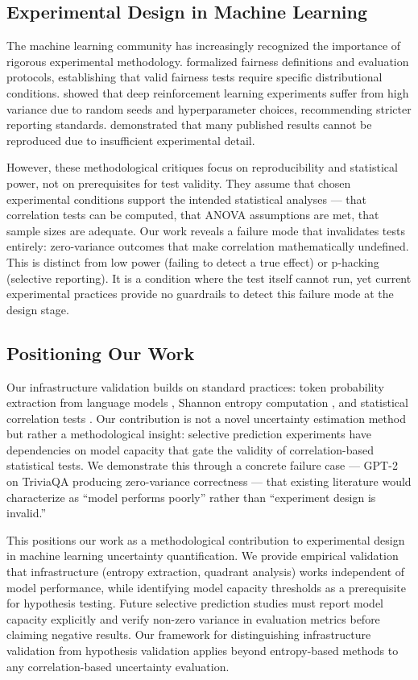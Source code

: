 \subsection{Experimental Design in Machine Learning}

The machine learning community has increasingly recognized the importance of rigorous experimental methodology. \citet{Dwork2015} formalized fairness definitions and evaluation protocols, establishing that valid fairness tests require specific distributional conditions. \citet{Henderson2018} showed that deep reinforcement learning experiments suffer from high variance due to random seeds and hyperparameter choices, recommending stricter reporting standards. \citet{Bouthillier2021} demonstrated that many published results cannot be reproduced due to insufficient experimental detail.

However, these methodological critiques focus on reproducibility and statistical power, not on prerequisites for test validity. They assume that chosen experimental conditions support the intended statistical analyses --- that correlation tests can be computed, that ANOVA assumptions are met, that sample sizes are adequate. Our work reveals a failure mode that invalidates tests entirely: zero-variance outcomes that make correlation mathematically undefined. This is distinct from low power (failing to detect a true effect) or p-hacking (selective reporting). It is a condition where the test itself cannot run, yet current experimental practices provide no guardrails to detect this failure mode at the design stage.

\subsection{Positioning Our Work}

Our infrastructure validation builds on standard practices: token probability extraction from language models \citep{Hendrycks2017}, Shannon entropy computation \citep{Shannon1948}, and statistical correlation tests \citep{Spearman1904}. Our contribution is not a novel uncertainty estimation method but rather a methodological insight: selective prediction experiments have dependencies on model capacity that gate the validity of correlation-based statistical tests. We demonstrate this through a concrete failure case --- GPT-2 on TriviaQA producing zero-variance correctness --- that existing literature would characterize as ``model performs poorly'' rather than ``experiment design is invalid.''

This positions our work as a methodological contribution to experimental design in machine learning uncertainty quantification. We provide empirical validation that infrastructure (entropy extraction, quadrant analysis) works independent of model performance, while identifying model capacity thresholds as a prerequisite for hypothesis testing. Future selective prediction studies must report model capacity explicitly and verify non-zero variance in evaluation metrics before claiming negative results. Our framework for distinguishing infrastructure validation from hypothesis validation applies beyond entropy-based methods to any correlation-based uncertainty evaluation.
